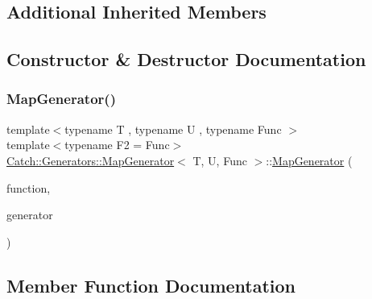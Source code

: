 \subsection*{Additional Inherited Members}


\subsection{Constructor \& Destructor Documentation}
\mbox{\label{class_catch_1_1_generators_1_1_map_generator_a525c7eaf53ad220ee7add534aff2522c}} 
\subsubsection{\texorpdfstring{MapGenerator()}{MapGenerator()}}
{\footnotesize\ttfamily template$<$typename T , typename U , typename Func $>$ \\
template$<$typename F2  = Func$>$ \\
\mbox{\hyperlink{class_catch_1_1_generators_1_1_map_generator}{Catch\+::\+Generators\+::\+Map\+Generator}}$<$ T, U, Func $>$\+::\mbox{\hyperlink{class_catch_1_1_generators_1_1_map_generator}{Map\+Generator}} (\begin{DoxyParamCaption}\item[{F2 \&\&}]{function,  }\item[{\mbox{\hyperlink{class_catch_1_1_generators_1_1_generator_wrapper}{Generator\+Wrapper}}$<$ U $>$ \&\&}]{generator }\end{DoxyParamCaption})\hspace{0.3cm}{\ttfamily [inline]}}



\subsection{Member Function Documentation}
\mbox{\label{class_catch_1_1_generators_1_1_map_generator_a199d377afba00519f202c59b4b488235}} 
